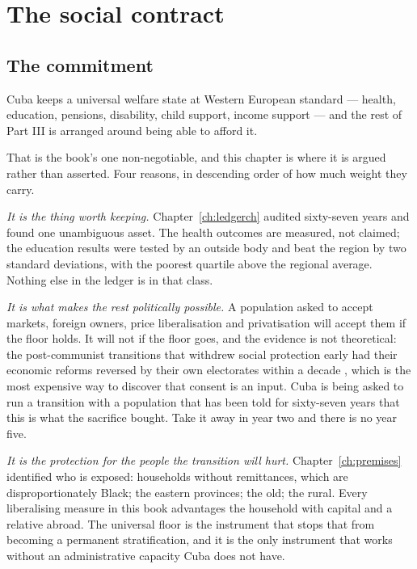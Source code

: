 \chapter{The social contract}
\label{ch:welfare}

\section{The commitment}

Cuba keeps a universal welfare state at Western European standard --- health,
education, pensions, disability, child support, income support --- and the rest
of Part III is arranged around being able to afford it.

That is the book's one non-negotiable, and this chapter is where it is argued
rather than asserted. Four reasons, in descending order of how much weight they
carry.

\emph{It is the thing worth keeping.} Chapter~\ref{ch:ledgerch} audited
sixty-seven years and found one unambiguous asset. The health outcomes are
measured, not claimed; the education results were tested by an outside body and
beat the region by two standard deviations, with the poorest quartile above the
regional average. Nothing else in the ledger is in that class.

\emph{It is what makes the rest politically possible.} A population asked to
accept markets, foreign owners, price liberalisation and privatisation will
accept them if the floor holds. It will not if the floor goes, and the evidence
is not theoretical: the post-communist transitions that withdrew social
protection early had their economic reforms reversed by their own electorates
within a decade \citep{roland2000}, which is the most expensive way to discover that consent is an
input. Cuba is being asked to run a transition with a population that has been
told for sixty-seven years that this is what the sacrifice bought. Take it away
in year two and there is no year five.

\emph{It is the protection for the people the transition will hurt.}
Chapter~\ref{ch:premises} identified who is exposed: households without
remittances, which are disproportionately Black; the eastern provinces; the old;
the rural. Every liberalising measure in this book advantages the household with
capital and a relative abroad. The universal floor is the instrument that stops
that from becoming a permanent stratification, and it is the only instrument
that works without an administrative capacity Cuba does not have.

